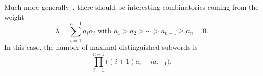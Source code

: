 \documentclass[a4paper,10pt,leqno]{amsart}
\numberwithin{equation}{section}
\theoremstyle{definition}
\theoremstyle{remark}
\begin{document}
Much more generally~\cite[Conjecture 7.1]{armstrong2012combinatorics}, there should be interesting combinatorics coming from the weight \[\lambda = \sum_{i=1}^{n-1} a_i \alpha_i \text{ with } a_1 > a_2 > \cdots > a_{n-1} \geq a_n=0.\]  In this case, the number of maximal distinguished subwords is~\cite{armstrong2012combinatorics}
\[\prod_{i=1}^{n-1} \big((i+1)a_i-i a_{i+1}\big).\]
\end{document}
